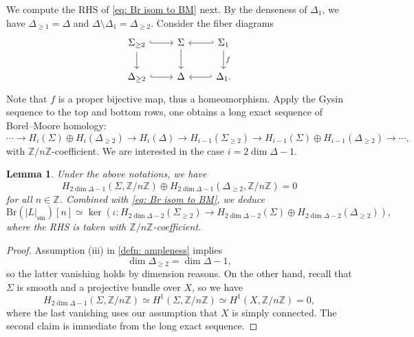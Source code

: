 \documentclass[11pt]{amsart}
\theoremstyle{plain}
\newtheorem{lem}[thm]{Lemma}
\theoremstyle{definition}
\theoremstyle{remark}
\begin{document}
We compute the RHS of \eqref{eq: Br isom to BM} next. By the denseness of $\Delta_1$, we have $\Delta_{\geq 1} = \Delta$ and $\Delta \setminus \Delta_1 = \Delta_{\geq 2}$. Consider the fiber diagrams
\[\begin{tikzcd}
	{\Sigma_{\geq 2}} & \Sigma & {\Sigma_1} \\
	{\Delta_{\geq 2}} & \Delta & {\Delta_1.}
	\arrow[hook, from=1-1, to=1-2]
	\arrow[from=1-1, to=2-1]
	\arrow[from=1-2, to=2-2]
	\arrow[hook', from=1-3, to=1-2]
	\arrow["f", from=1-3, to=2-3]
	\arrow[hook, from=2-1, to=2-2]
	\arrow[hook', from=2-3, to=2-2]
\end{tikzcd}\]
Note that $f$ is a proper bijective map, thus a homeomorphism. Apply the Gysin sequence to the top and bottom rows, one obtains a long exact sequence of Borel--Moore homology:
\[
\cdots \to H_i(\Sigma) \oplus H_i(\Delta_{\geq 2}) \to H_i(\Delta) \to H_{i-1}(\Sigma_{\geq 2}) \to H_{i-1} (\Sigma) \oplus H_{i-1}(\Delta_{\geq 2}) \to \cdots,
\]
with $\mathbb Z/n \mathbb Z$-coefficient. We are interested in the case $i=2\dim \Delta -1$.

\begin{lem}\label{lemma: br isom to ker}
    Under the above notations, we have 
    \[
    H_{2\dim\Delta -1}(\Sigma, \mathbb Z/ n \mathbb Z) \oplus H_{2\dim \Delta -1}(\Delta_{\geq 2}, \mathbb Z/ n \mathbb Z)= 0
    \]
    for all $n \in \mathbb Z$. Combined with \eqref{eq: Br isom to BM}, we deduce 
    \begin{equation}\label{eq: Br isom to ker}
    \mathrm{Br}(|L|_\mathrm{sm})[n]\simeq \ker\left(\iota: H_{2\dim \Delta -2}(\Sigma_{\geq 2}) \to H_{2\dim \Delta-2} (\Sigma) \oplus H_{2\dim \Delta-2}(\Delta_{\geq 2}) \right),
    \end{equation}
    where the RHS is taken with $\mathbb Z/ n\mathbb Z$-coefficient.
\end{lem}

\begin{proof}
    Assumption (iii) in \ref{defn: ampleness} implies
    \[
    \dim \Delta_{\geq 2} = \dim \Delta -1,
    \]
    so the latter vanishing holds by dimension reasons. On the other hand, recall that $\Sigma$ is smooth and a projective bundle over $X$,
    so we have
    \[
    H_{2\dim\Delta -1}(\Sigma, \mathbb Z/ n \mathbb Z) \simeq H^1(\Sigma, \mathbb Z/ n \mathbb Z) \simeq H^1(X, \mathbb Z/ n \mathbb Z) = 0,
    \]
    where the last vanishing uses our assumption that $X$ is simply connected. The second claim is immediate from the long exact sequence.
\end{proof}
\end{document}
